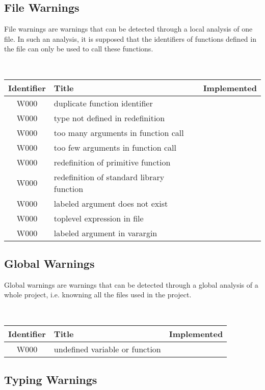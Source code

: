 \subsection{File Warnings}

File warnings are warnings that can be detected through a local
analysis of one file. In such an analysis, it is supposed that the
identifiers of functions defined in the file can only be used to call
these functions.

\noindent\\\begin{tabular}{|c|p{8cm}|c|} \hline
Identifier & Title & Implemented      \\ \hline
W000 & duplicate function identifier &  \\ \hline
W000 & type not defined in redefinition &  \\ \hline
W000 & too many arguments in function call &  \\ \hline
W000 & too few arguments in function call  &  \\ \hline
W000 & redefinition of primitive function &  \\ \hline
W000 & redefinition of standard library function &  \\ \hline
W000 & labeled argument does not exist &  \\ \hline
W000 & toplevel expression in file &  \\ \hline
W000 & labeled argument in varargin &  \\ \hline
\end{tabular}

\subsection{Global Warnings}

Global warnings are warnings that can be detected through a global
analysis of a whole project, i.e. knowning all the files used in the
project.

\noindent\\\begin{tabular}{|c|p{8cm}|c|} \hline
Identifier & Title & Implemented      \\ \hline
W000 & undefined variable or function &  \\ \hline
\end{tabular}

\subsection{Typing Warnings}



